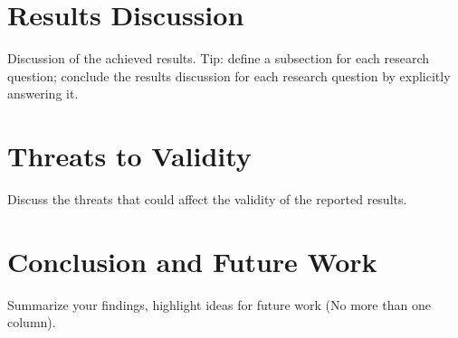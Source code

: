 \documentclass[sigconf,review]{acmart}
\begin{document}
\section{Results Discussion}
Discussion of the achieved results. Tip: define a subsection for each research question; conclude the results discussion for each research question by explicitly answering it.

\section{Threats to Validity}
Discuss the threats that could affect the validity of the reported results.

\section{Conclusion and Future Work}
Summarize your findings, highlight ideas for future work (No more than one column).




\end{document}
